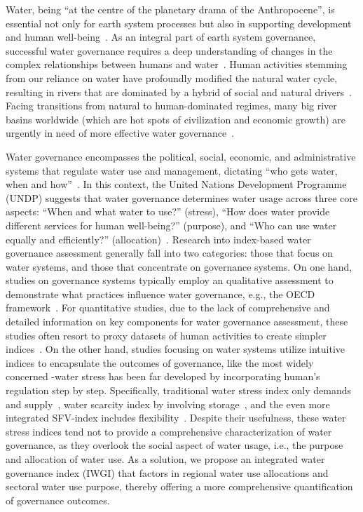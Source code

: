 
Water, being ``at the centre of the planetary drama of the Anthropocene'', is essential not only for earth system processes but also in supporting development and human well-being~\cite{gleeson2020a,gleeson2020b}.
As an integral part of earth system governance, successful water governance requires a deep understanding of changes in the complex relationships between humans and water~\cite{ahlstrom2021,biermann2012,steffen2020}.
Human activities stemming from our reliance on water have profoundly modified the natural water cycle, resulting in rivers that are dominated by a hybrid of social and natural drivers~\cite{sivapalan2012,qin2014a,abbott2019}.
Facing transitions from natural to human-dominated regimes, many big river basins worldwide (which are hot spots of civilization and economic growth) are urgently in need of more effective water governance~\cite{best2019,dibaldassarre2019}.

Water governance encompasses the political, social, economic, and administrative systems that regulate water use and management, dictating ``who gets water, when and how''~\cite{lasswell2018,allan2001}.
In this context, the United Nations Development Programme (UNDP) suggests that water governance determines water usage across three core aspects: ``When and what water to use?'' (stress), ``How does water provide different services for human well-being?'' (purpose), and ``Who can use water equally and efficiently?'' (allocation)~\cite{mariajacobson2013}.
Research into index-based water governance assessment generally fall into two categories: those that focus on water systems, and those that concentrate on governance systems.
On one hand, studies on governance systems typically employ an qualitative assessment to demonstrate what practices influence water governance, e.g., the OECD framework~\cite{oecd2018a}.
For quantitative studies, due to the lack of comprehensive and detailed information on key components for water governance assessment, these studies often resort to proxy datasets of human activities to create simpler indices~\cite{varis2019,huggins2022a}.
On the other hand, studies focusing on water systems utilize intuitive indices to encapsulate the outcomes of governance, like the most widely concerned -water stress has been far developed by incorporating human's regulation step by step.
Specifically, traditional water stress index only demands and supply~\cite{gleick1996}, water scarcity index by involving storage~\cite{damkjaer2017}, and the even more integrated SFV-index includes flexibility~\cite{qin2019}.
Despite their usefulness, these water stress indices tend not to provide a comprehensive characterization of water governance, as they overlook the social aspect of water usage, i.e., the purpose and allocation of water use.
As a solution, we propose an integrated water governance index (IWGI) that factors in regional water use allocations and sectoral water use purpose, thereby offering a more comprehensive quantification of governance outcomes.

